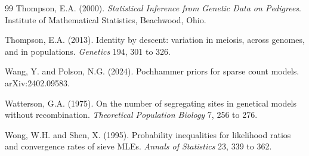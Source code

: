 \begin{thebibliography}{99}
Thompson, E.A. (2000). \emph{Statistical Inference from Genetic Data on Pedigrees}. Institute
of Mathematical Statistics, Beachwood, Ohio.

Thompson, E.A. (2013). Identity by descent: variation in meiosis, across genomes, and in
populations. \emph{Genetics} 194, 301 to 326.

Wang, Y. and Polson, N.G. (2024). Pochhammer priors for sparse count models. arXiv:2402.09583.

Watterson, G.A. (1975). On the number of segregating sites in genetical models without
recombination. \emph{Theoretical Population Biology} 7, 256 to 276.

Wong, W.H. and Shen, X. (1995). Probability inequalities for likelihood ratios and convergence
rates of sieve MLEs. \emph{Annals of Statistics} 23, 339 to 362.

\end{thebibliography}
